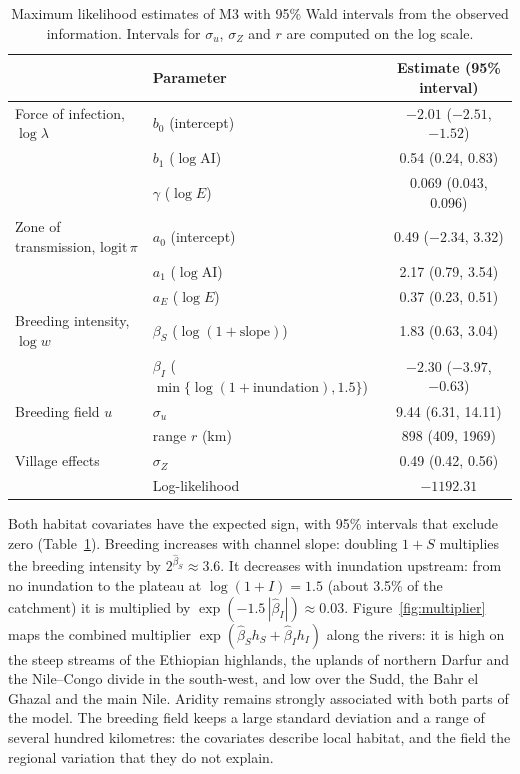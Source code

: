 \documentclass[11pt,a4paper]{article}
\newcommand{\AI}{\mathrm{AI}}
\begin{document}
\begin{table}[H]
\centering
\small
\caption{Maximum likelihood estimates of M3 with 95\% Wald intervals from the observed information. Intervals for $\sigma_u$, $\sigma_Z$ and $r$ are computed on the log scale.}
\label{tab:m3est}
\begin{tabular}{llc}
\toprule
 & Parameter & Estimate (95\% interval) \\
\midrule
Force of infection, $\log\lambda$ & $b_0$ (intercept) & $-2.01$ ($-2.51$, $-1.52$) \\
 & $b_1$ ($\log\AI$) & 0.54 (0.24, 0.83) \\
 & $\gamma$ ($\log E$) & 0.069 (0.043, 0.096) \\
Zone of transmission, $\mathrm{logit}\,\pi$ & $a_0$ (intercept) & 0.49 ($-2.34$, 3.32) \\
 & $a_1$ ($\log\AI$) & 2.17 (0.79, 3.54) \\
 & $a_E$ ($\log E$) & 0.37 (0.23, 0.51) \\
Breeding intensity, $\log w$ & $\beta_S$ ($\log(1 + \text{slope})$) & 1.83 (0.63, 3.04) \\
 & $\beta_I$ ($\min\{\log(1 + \text{inundation}), 1.5\}$) & $-2.30$ ($-3.97$, $-0.63$) \\
Breeding field $u$ & $\sigma_u$ & 9.44 (6.31, 14.11) \\
 & range $r$ (km) & 898 (409, 1969) \\
Village effects & $\sigma_Z$ & 0.49 (0.42, 0.56) \\
\midrule
 & Log-likelihood & $-1192.31$ \\
\bottomrule
\end{tabular}
\end{table}

Both habitat covariates have the expected sign, with 95\% intervals that exclude zero (Table~\ref{tab:m3est}). Breeding increases with channel slope: doubling $1 + S$ multiplies the breeding intensity by $2^{\hat\beta_S} \approx 3.6$. It decreases with inundation upstream: from no inundation to the plateau at $\log(1 + I) = 1.5$ (about 3.5\% of the catchment) it is multiplied by $\exp(-1.5\,|\hat\beta_I|) \approx 0.03$. Figure~\ref{fig:multiplier} maps the combined multiplier $\exp(\hat\beta_S h_S + \hat\beta_I h_I)$ along the rivers: it is high on the steep streams of the Ethiopian highlands, the uplands of northern Darfur and the Nile--Congo divide in the south-west, and low over the Sudd, the Bahr el Ghazal and the main Nile. Aridity remains strongly associated with both parts of the model. The breeding field keeps a large standard deviation and a range of several hundred kilometres: the covariates describe local habitat, and the field the regional variation that they do not explain.
\end{document}
